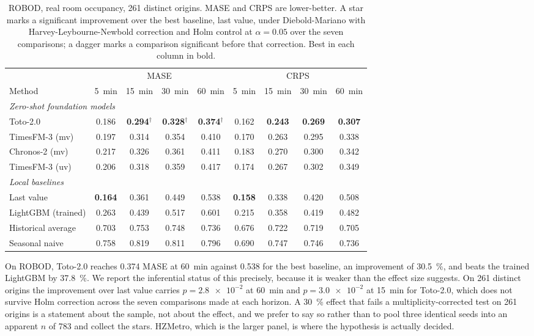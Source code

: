 \documentclass[11pt]{article}
\theoremstyle{plain}
\theoremstyle{definition}
\theoremstyle{remark}
\newcommand{\best}[1]{\textbf{#1}}
\begin{document}
\begin{table}[htbp]
\centering
\caption{ROBOD, real room occupancy, \num{261} distinct origins. MASE and CRPS are lower-better. A star marks a significant improvement over the best baseline, last value, under Diebold-Mariano with Harvey-Leybourne-Newbold correction and Holm control at $\alpha=0.05$ over the seven comparisons; a dagger marks a comparison significant before that correction. Best in each column in bold.}
\label{tab:robod}
\small
\begin{tabular}{lcccccccc}
\toprule
& \multicolumn{4}{c}{MASE} & \multicolumn{4}{c}{CRPS} \\
\cmidrule(lr){2-5}\cmidrule(lr){6-9}
Method & \SI{5}{\minute} & \SI{15}{\minute} & \SI{30}{\minute} & \SI{60}{\minute} & \SI{5}{\minute} & \SI{15}{\minute} & \SI{30}{\minute} & \SI{60}{\minute} \\
\midrule
\multicolumn{9}{l}{\emph{Zero-shot foundation models}}\\
Toto-2.0                & 0.186 & \best{0.294}$^{\dagger}$ & \best{0.328}$^{\dagger}$ & \best{0.374}$^{\dagger}$ & 0.162 & \best{0.243} & \best{0.269} & \best{0.307} \\
TimesFM-3 (mv)          & 0.197 & 0.314 & 0.354 & 0.410 & 0.170 & 0.263 & 0.295 & 0.338 \\
Chronos-2 (mv)          & 0.217 & 0.326 & 0.361 & 0.411 & 0.183 & 0.270 & 0.300 & 0.342 \\
TimesFM-3 (uv)          & 0.206 & 0.318 & 0.359 & 0.417 & 0.174 & 0.267 & 0.302 & 0.349 \\
\midrule
\multicolumn{9}{l}{\emph{Local baselines}}\\
Last value              & \best{0.164} & 0.361 & 0.449 & 0.538 & \best{0.158} & 0.338 & 0.420 & 0.508 \\
LightGBM (trained)      & 0.263 & 0.439 & 0.517 & 0.601 & 0.215 & 0.358 & 0.419 & 0.482 \\
Historical average      & 0.703 & 0.753 & 0.748 & 0.736 & 0.676 & 0.722 & 0.719 & 0.705 \\
Seasonal naive          & 0.758 & 0.819 & 0.811 & 0.796 & 0.690 & 0.747 & 0.746 & 0.736 \\
\bottomrule
\end{tabular}
\end{table}

On ROBOD, Toto-2.0 reaches \num{0.374} MASE at \SI{60}{\minute} against \num{0.538} for the best baseline, an improvement of \SI{30.5}{\percent}, and beats the trained LightGBM by \SI{37.8}{\percent}. We report the inferential status of this precisely, because it is weaker than the effect size suggests. On \num{261} distinct origins the improvement over last value carries $p=\num{2.8e-2}$ at \SI{60}{\minute} and $p=\num{3.0e-2}$ at \SI{15}{\minute} for Toto-2.0, which does not survive Holm correction across the seven comparisons made at each horizon. A \SI{30}{\percent} effect that fails a multiplicity-corrected test on \num{261} origins is a statement about the sample, not about the effect, and we prefer to say so rather than to pool three identical seeds into an apparent $n$ of \num{783} and collect the stars. HZMetro, which is the larger panel, is where the hypothesis is actually decided.
\end{document}
